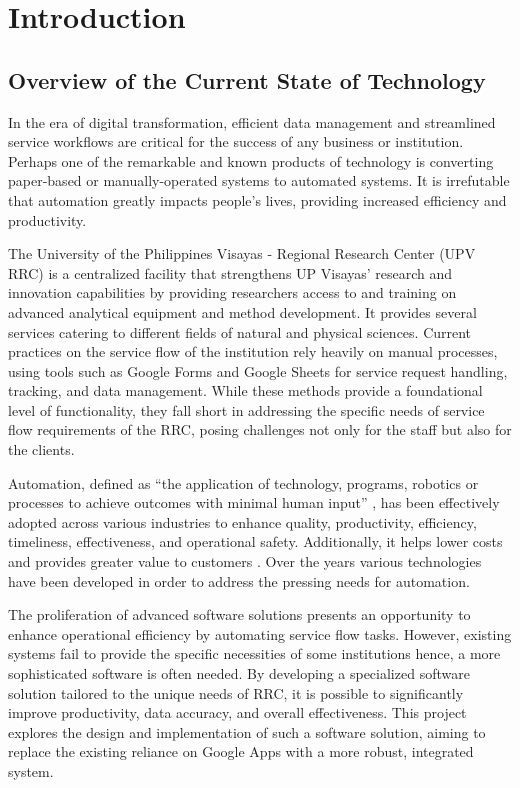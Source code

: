 \chapter{Introduction}
\label{sec:researchdesc}    %

\section{Overview of the Current State of Technology}
\label{sec:overview}

In the era of digital transformation, efficient data management and streamlined service workflows are critical for the success of any business or institution. Perhaps one of the remarkable and known products of technology is converting paper-based or manually-operated systems to automated systems. It is irrefutable that automation greatly impacts people's lives, providing increased efficiency and productivity.

The University of the Philippines Visayas - Regional Research Center (UPV RRC) is a centralized facility that strengthens UP Visayas’ research and innovation capabilities by providing researchers access to and training on advanced analytical equipment and method development. It provides several services catering to different fields of natural and physical sciences. Current practices on the service flow of the institution rely heavily on manual processes, using tools such as Google Forms and Google Sheets for service request handling, tracking, and data management. While these methods provide a foundational level of functionality, they fall short in addressing the specific needs of service flow requirements of the RRC, posing challenges not only for the staff but also for the clients. 

Automation, defined as “the application of technology, programs, robotics or processes to achieve outcomes with minimal human input” \cite{ibm}, has been effectively adopted across various industries to enhance quality, productivity, efficiency, timeliness, effectiveness, and operational safety. Additionally, it helps lower costs and provides greater value to customers \cite{caban2021}. Over the years various technologies have been developed in order to address the pressing needs for automation. 

The proliferation of advanced software solutions presents an opportunity to enhance operational efficiency by automating service flow tasks. However, existing systems fail to provide the specific necessities of some institutions hence, a more sophisticated software is often needed. By developing a specialized software solution tailored to the unique needs of RRC, it is possible to significantly improve productivity, data accuracy, and overall effectiveness. This project explores the design and implementation of such a software solution, aiming to replace the existing reliance on Google Apps with a more robust, integrated system.
  
